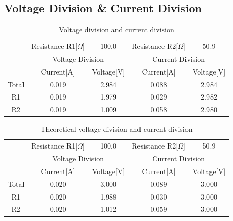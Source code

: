 \documentclass[12pt]{article}
\begin{document}
\subsection{Voltage Division \& Current Division}
\begin{table}[H]
\centering
\begin{tabular}{|c|c|c|c|c|}
\hline
\multirow{3}{*}{} & Resistance R1[$\Omega$]      & 100.0          & Resistance R2[$\Omega$]      & 50.9           \\ \cline{2-5} 
                  & \multicolumn{2}{c|}{Voltage Division} & \multicolumn{2}{c|}{Current Division} \\ \cline{2-5} 
                  & Current[A]           & Voltage[V]     & Current[A]           & Voltage[V]     \\ \hline
Total             & 0.019                & 2.984          & 0.088                & 2.984          \\ \hline
R1                & 0.019                & 1.979          & 0.029                & 2.982          \\ \hline
R2                & 0.019                & 1.009          & 0.058                & 2.980          \\ \hline
\end{tabular}
\caption{Voltage division and current division}
\end{table}
\begin{table}[H]
\centering
\begin{tabular}{|c|c|c|c|c|}
\hline
\multirow{3}{*}{} & Resistance R1[$\Omega$]      & 100.0          & Resistance R2[$\Omega$]      & 50.9           \\ \cline{2-5} 
                  & \multicolumn{2}{c|}{Voltage Division} & \multicolumn{2}{c|}{Current Division} \\ \cline{2-5} 
                  & Current[A]           & Voltage[V]     & Current[A]           & Voltage[V]     \\ \hline
Total             & 0.020               & 3.000          & 0.089                & 3.000          \\ \hline
R1                & 0.020                & 1.988          & 0.030                & 3.000         \\ \hline
R2                & 0.020                & 1.012          & 0.059                & 3.000 \\ \hline
\end{tabular}
\caption{Theoretical voltage division and current division}
\end{table}
\end{document}

